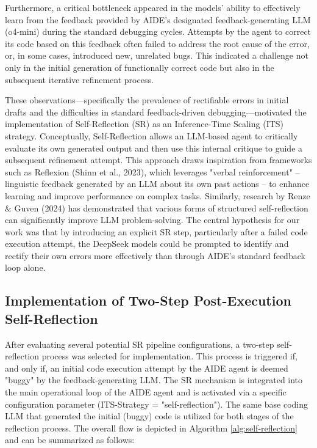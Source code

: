 Furthermore, a critical bottleneck appeared in the models' ability to effectively learn from the feedback provided by AIDE's designated feedback-generating LLM (o4-mini) during the standard debugging cycles. Attempts by the agent to correct its code based on this feedback often failed to address the root cause of the error, or, in some cases, introduced new, unrelated bugs. This indicated a challenge not only in the initial generation of functionally correct code but also in the subsequent iterative refinement process.

These observations—specifically the prevalence of rectifiable errors in initial drafts and the difficulties in standard feedback-driven debugging—motivated the implementation of Self-Reflection (SR) as an Inference-Time Scaling (ITS) strategy. Conceptually, Self-Reflection allows an LLM-based agent to critically evaluate its own generated output and then use this internal critique to guide a subsequent refinement attempt. This approach draws inspiration from frameworks such as Reflexion (Shinn et al., 2023), which leverages "verbal reinforcement" – linguistic feedback generated by an LLM about its own past actions – to enhance learning and improve performance on complex tasks. Similarly, research by Renze \& Guven (2024) has demonstrated that various forms of structured self-reflection can significantly improve LLM problem-solving. The central hypothesis for our work was that by introducing an explicit SR step, particularly after a failed code execution attempt, the DeepSeek models could be prompted to identify and rectify their own errors more effectively than through AIDE's standard feedback loop alone.

\subsection{Implementation of Two-Step Post-Execution Self-Reflection}

After evaluating several potential SR pipeline configurations, a two-step self-reflection process was selected for implementation. This process is triggered if, and only if, an initial code execution attempt by the AIDE agent is deemed "buggy" by the feedback-generating LLM. The SR mechanism is integrated into the main operational loop of the AIDE agent and is activated via a specific configuration parameter (ITS-Strategy = "self-reflection"). The same base coding LLM that generated the initial (buggy) code is utilized for both stages of the reflection process. The overall flow is depicted in Algorithm \ref{alg:self-reflection} and can be summarized as follows:

